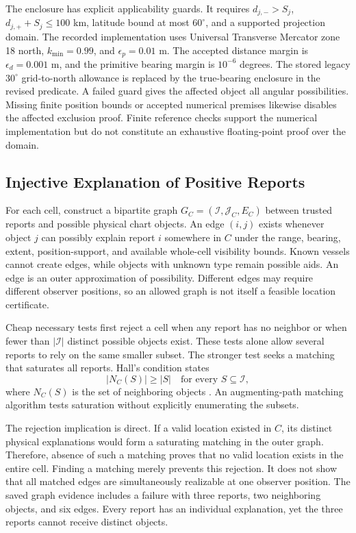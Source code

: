 \documentclass[conference]{IEEEtran}
\begin{document}
The enclosure has explicit applicability guards. It requires $d_{j,-}>S_j$, $d_{j,+}+S_j\leq100$ km, latitude bound at most $60^\circ$, and a supported projection domain. The recorded implementation uses Universal Transverse Mercator zone 18 north, $k_{\min}=0.99$, and $\epsilon_p=0.01$ m. The accepted distance margin is $\epsilon_d=0.001$ m, and the primitive bearing margin is $10^{-6}$ degrees. The stored legacy $30^\circ$ grid-to-north allowance is replaced by the true-bearing enclosure in the revised predicate. A failed guard gives the affected object all angular possibilities. Missing finite position bounds or accepted numerical premises likewise disables the affected exclusion proof. Finite reference checks support the numerical implementation but do not constitute an exhaustive floating-point proof over the domain.

\subsection{Injective Explanation of Positive Reports}
For each cell, construct a bipartite graph $G_C=(\mathcal I,\mathcal J_C,E_C)$ between trusted reports and possible physical chart objects. An edge $(i,j)$ exists whenever object $j$ can possibly explain report $i$ somewhere in $C$ under the range, bearing, extent, position-support, and available whole-cell visibility bounds. Known vessels cannot create edges, while objects with unknown type remain possible aids. An edge is an outer approximation of possibility. Different edges may require different observer positions, so an allowed graph is not itself a feasible location certificate.

Cheap necessary tests first reject a cell when any report has no neighbor or when fewer than $|\mathcal I|$ distinct possible objects exist. These tests alone allow several reports to rely on the same smaller subset. The stronger test seeks a matching that saturates all reports. Hall's condition states
\begin{equation}
 |N_C(S)|\geq |S|\quad\text{for every }S\subseteq\mathcal I,
 \label{eq:hall}
\end{equation}
where $N_C(S)$ is the set of neighboring objects \cite{Hall1935Representatives}. An augmenting-path matching algorithm tests saturation without explicitly enumerating the subsets.

The rejection implication is direct. If a valid location existed in $C$, its distinct physical explanations would form a saturating matching in the outer graph. Therefore, absence of such a matching proves that no valid location exists in the entire cell. Finding a matching merely prevents this rejection. It does not show that all matched edges are simultaneously realizable at one observer position. The saved graph evidence includes a failure with three reports, two neighboring objects, and six edges. Every report has an individual explanation, yet the three reports cannot receive distinct objects.
\end{document}
